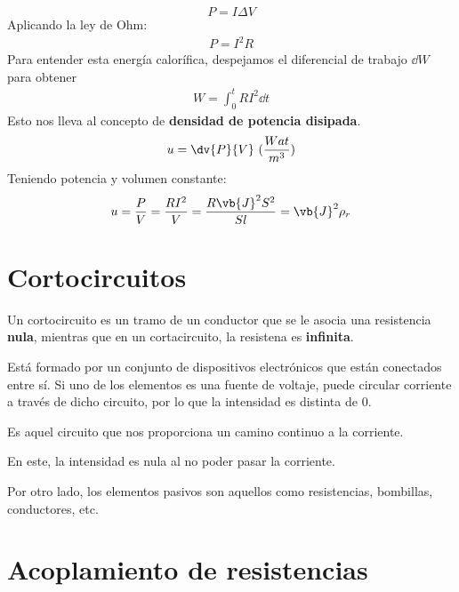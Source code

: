 \documentclass{./FisicaII.tex}
\begin{document}
\[
	P = I \Delta V
\]
Aplicando la ley de Ohm:
\begin{equation}
	\begin{split}
		P = I ^{2} R
	\end{split}
\end{equation}
Para entender esta energía calorífica, despejamos el diferencial de trabajo $\dd{W}$ para obtener
\begin{equation}
	\begin{split}
		W = \int_{0}^{t}R I ^{2} \dd{t}
	\end{split}
\end{equation}
Esto nos lleva al concepto de \textbf{densidad de potencia disipada}.
\begin{equation}
	\begin{split}
		u = \dv{P}{V}~(\frac{Wat}{m^{3}})
	\end{split}
\end{equation}
Teniendo potencia y volumen constante:
\begin{equation}
	\begin{split}
		u = \frac{P}{V} = \frac{RI ^{2}}{V} = \frac{R \vb{J}^{2} S ^{2}}{S l} = \vb{J} ^{2} \rho_{r}
	\end{split}
\end{equation}
\section{Cortocircuitos}
Un cortocircuito es un tramo de un conductor que se le asocia una resistencia \textbf{nula}, mientras que en un cortacircuito, la resistena es \textbf{infinita}.
\begin{defin}[Circuito]
Está formado por un conjunto de dispositivos electrónicos que están conectados entre sí. Si uno de los elementos es una fuente de voltaje, puede circular corriente a través de dicho circuito, por lo que la intensidad es distinta de $0$. 
\end{defin}
\begin{defin}
	Es aquel circuito que nos proporciona un camino continuo a la corriente.
\end{defin}
\begin{defin}
	En este, la intensidad es nula al no poder pasar la corriente.
\end{defin}
Por otro lado, los elementos pasivos son aquellos como resistencias, bombillas, conductores, etc.
\section{Acoplamiento de resistencias}
\end{document}
